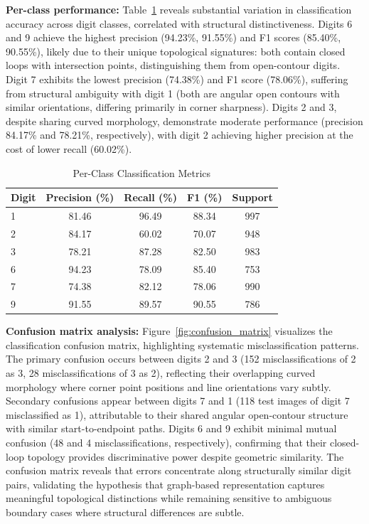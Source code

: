 \documentclass[runningheads]{llncs}
\begin{document}
\textbf{Per-class performance:} Table~\ref{tab:perclass_metrics} reveals substantial variation in classification accuracy across digit classes, correlated with structural distinctiveness. Digits 6 and 9 achieve the highest precision (94.23\%, 91.55\%) and F1 scores (85.40\%, 90.55\%), likely due to their unique topological signatures: both contain closed loops with intersection points, distinguishing them from open-contour digits. Digit 7 exhibits the lowest precision (74.38\%) and F1 score (78.06\%), suffering from structural ambiguity with digit 1 (both are angular open contours with similar orientations, differing primarily in corner sharpness). Digits 2 and 3, despite sharing curved morphology, demonstrate moderate performance (precision 84.17\% and 78.21\%, respectively), with digit 2 achieving higher precision at the cost of lower recall (60.02\%).

\begin{table}[!t]
\caption{Per-Class Classification Metrics}
\label{tab:perclass_metrics}
\centering
\begin{tabular}{lcccc}
\hline
\textbf{Digit} & \textbf{Precision (\%)} & \textbf{Recall (\%)} & \textbf{F1 (\%)} & \textbf{Support} \\
\hline
1 & 81.46 & 96.49 & 88.34 & 997 \\
2 & 84.17 & 60.02 & 70.07 & 948 \\
3 & 78.21 & 87.28 & 82.50 & 983 \\
6 & 94.23 & 78.09 & 85.40 & 753 \\
7 & 74.38 & 82.12 & 78.06 & 990 \\
9 & 91.55 & 89.57 & 90.55 & 786 \\
\hline
\end{tabular}
\end{table}

\textbf{Confusion matrix analysis:} Figure~\ref{fig:confusion_matrix} visualizes the classification confusion matrix, highlighting systematic misclassification patterns. The primary confusion occurs between digits 2 and 3 (152 misclassifications of 2 as 3, 28 misclassifications of 3 as 2), reflecting their overlapping curved morphology where corner point positions and line orientations vary subtly. Secondary confusions appear between digits 7 and 1 (118 test images of digit 7 misclassified as 1), attributable to their shared angular open-contour structure with similar start-to-endpoint paths. Digits 6 and 9 exhibit minimal mutual confusion (48 and 4 misclassifications, respectively), confirming that their closed-loop topology provides discriminative power despite geometric similarity. The confusion matrix reveals that errors concentrate along structurally similar digit pairs, validating the hypothesis that graph-based representation captures meaningful topological distinctions while remaining sensitive to ambiguous boundary cases where structural differences are subtle.
\end{document}
